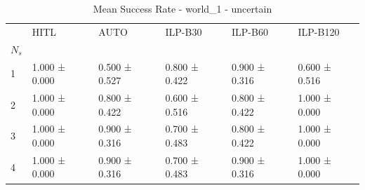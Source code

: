 \begin{table}
\caption{Mean Success Rate - world_1 - uncertain}
\label{tab:success_rate_uncertain}
\begin{tabular}{llllll}
\toprule
 & HITL & AUTO & ILP-B30 & ILP-B60 & ILP-B120 \\
$N_s$ &  &  &  &  &  \\
\midrule
1 & 1.000 ± 0.000 & 0.500 ± 0.527 & 0.800 ± 0.422 & 0.900 ± 0.316 & 0.600 ± 0.516 \\
2 & 1.000 ± 0.000 & 0.800 ± 0.422 & 0.600 ± 0.516 & 0.800 ± 0.422 & 1.000 ± 0.000 \\
3 & 1.000 ± 0.000 & 0.900 ± 0.316 & 0.700 ± 0.483 & 0.800 ± 0.422 & 1.000 ± 0.000 \\
4 & 1.000 ± 0.000 & 0.900 ± 0.316 & 0.700 ± 0.483 & 0.900 ± 0.316 & 1.000 ± 0.000 \\
\bottomrule
\end{tabular}
\end{table}
